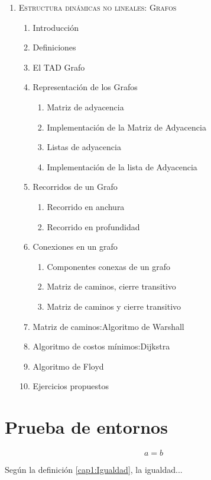 \begin{enumerate}
	\item \textsc{Estructura dinámicas no lineales: Grafos}
	\begin{enumerate}
		\item Introducción
		\item Definiciones
		\item El TAD Grafo
		\item Representación de los Grafos
		\begin{enumerate}
			\item Matriz de adyacencia
			\item Implementación de la Matriz de Adyacencia
			\item Listas de adyacencia
			\item Implementación de la lista de Adyacencia
		\end{enumerate}	
		\item Recorridos de un Grafo
		\begin{enumerate}
			\item Recorrido en anchura
			\item Recorrido en profundidad
		\end{enumerate}			
		\item Conexiones en un grafo
		\begin{enumerate}
			\item Componentes conexas de un grafo
			\item Matriz de caminos, cierre transitivo
			\item Matriz de caminos y cierre transitivo
		\end{enumerate}	
		\item Matriz de caminos:Algoritmo de Warshall
		\item Algoritmo de costos mínimos:Dijkstra
		\item Algoritmo de Floyd
		\item Ejercicios propuestos
	\end{enumerate}							
								
\end{enumerate}		

\section{Prueba de entornos}

\begin{definicion}
  $$a=b$$
\end{definicion}

\bigskip
Según la definición \ref{cap1:Igualdad}, la igualdad...\\

